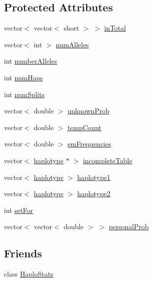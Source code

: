 \subsection*{Protected Attributes}
\begin{DoxyCompactItemize}
\item 
vector$<$ vector$<$ short $>$ $>$ \hyperlink{classEM_a0a7a49feeff6a6ce2908bd626c876a60}{inTotal}
\item 
vector$<$ int $>$ \hyperlink{classEM_a8355d01f8998e654c32b1fc8f478ced1}{numAlleles}
\item 
int \hyperlink{classEM_ae8420599f2bb0359bec3f8640699aa43}{numberAlleles}
\item 
int \hyperlink{classEM_a6fb53f57dafe2497417ae7b55748a2f5}{numHaps}
\item 
int \hyperlink{classEM_af93ac6cc803cd05ab2a266e77b864ae1}{numSplits}
\item 
vector$<$ double $>$ \hyperlink{classEM_adc712759a9c74b26826ffbc28d4cf410}{unknownProb}
\item 
vector$<$ double $>$ \hyperlink{classEM_ae28d8a79298bd3b15801f4eff84216b1}{tempCount}
\item 
vector$<$ double $>$ \hyperlink{classEM_ae76fe505f85355d362d5022436980331}{emFrequencies}
\item 
vector$<$ \hyperlink{classhaplotype}{haplotype} $\ast$ $>$ \hyperlink{classEM_a16a75209aa892c812af91aaea1b41500}{incompleteTable}
\item 
vector$<$ \hyperlink{classhaplotype}{haplotype} $>$ \hyperlink{classEM_a4d771fc7aca0ee55ee0b8742269b54e7}{haplotype1}
\item 
vector$<$ \hyperlink{classhaplotype}{haplotype} $>$ \hyperlink{classEM_a7eb2fa8a9c6db4c1425d77298cec869d}{haplotype2}
\item 
int \hyperlink{classEM_a138450b0d00acac64fd8a272b999be9f}{setFor}
\item 
vector$<$ vector$<$ double $>$ $>$ \hyperlink{classEM_abb7e20d53630eb8b692084ba1cf666c5}{personalProb}
\end{DoxyCompactItemize}
\subsection*{Friends}
\begin{DoxyCompactItemize}
\item 
class \hyperlink{classEM_ab5eb8e85b324a9728c593bdc1ada8198}{HaploStats}
\end{DoxyCompactItemize}


